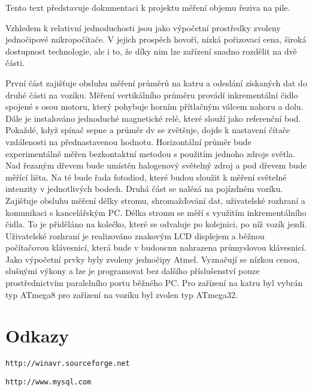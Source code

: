 Tento text představuje dokumentaci k projektu měření objemu řeziva na pile.

Vzhledem k relativní jednoduchosti jsou jako výpočetní prostředky zvoleny jednočipové mikropočítače. V jejich prospěch hovoří, nízká pořizovací cena, široká dostupnost technologie, ale i to, že díky nim lze zařízení snadno rozdělit na dvě části.



První část zajišťuje obsluhu měření průměrů na katru a odeslání získaných dat do druhé části na vozíku. Měření vertikálního průměru provádí inkrementální čidlo spojené s osou motoru, který pohybuje horním přítlačným válcem nahoru a dolu. Dále je instalováno jednoduché magnetické relé, které slouží jako referenční bod. Pokaždé, když spínač sepne a průměr dv se zvětšuje, dojde k nastavení čítače vzdálenosti na přednastavenou hodnotu. Horizontální průměr bude experimentálně měřen bezkontaktní metodou s použitím jednoho zdroje světla. Nad řezaným dřevem bude umístěn halogenový světelný zdroj a pod dřevem bude měřící lišta. Na té bude řada fotodiod, které budou sloužit k měření světelné intenzity v jednotlivých bodech. Druhá část se nalézá na pojízdném vozíku. Zajišťuje obsluhu měření délky stromu, shromažďování dat, uživatelské rozhraní a komunikaci s kancelářským PC. Délka stromu se měří s využitím inkrementálního čidla. To je přiděláno na kolečko, které se odvaluje po kolejnici, po níž vozík jezdí. Uživatelské rozhraní je realizováno znakovým LCD displejem a běžnou počítačovou klávesnicí, která bude v budoucnu nahrazena průmyslovou klávesnicí. Jako výpočetní prvky byly zvoleny jednočipy Atmel. Vyznačují se nízkou cenou, slušnými výkony a lze je programovat bez dalšího příslušenství pouze prostřednictvím paralelního portu běžného PC. Pro zařízení na katru byl vybrán typ ATmega8 pro zařízení na vozíku byl zvolen typ ATmega32.\section{Odkazy}\label{index_Odkazy}
{\tt http://winavr.sourceforge.net}

{\tt http://www.mysql.com} 